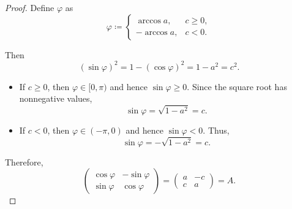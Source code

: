 \begin{proof}
  Define \( \varphi \) as
  \begin{equation*}
    \varphi \coloneqq \begin{cases}
      \arccos a,  &c \geq 0, \\
      -\arccos a, &c < 0.
    \end{cases}
  \end{equation*}

  Then
  \begin{equation*}
    (\sin \varphi)^2 = 1 - (\cos \varphi)^2 = 1 - a^2 = c^2.
  \end{equation*}

  \begin{itemize}
    \item If \( c \geq 0 \), then \( \varphi \in [0, \pi) \) and hence \( \sin \varphi \geq 0 \). Since the square root has nonnegative values,
    \begin{equation*}
      \sin \varphi = \sqrt{ 1 - a^2 } = c.
    \end{equation*}

    \item If \( c < 0 \), then \( \varphi \in (-\pi, 0) \) and hence \( \sin \varphi < 0 \). Thus,
    \begin{equation*}
      \sin \varphi = -\sqrt{ 1 - a^2 } = c.
    \end{equation*}
  \end{itemize}

  Therefore,
  \begin{equation*}
    \begin{pmatrix}
      \cos \varphi & -\sin \varphi \\
      \sin \varphi & \cos \varphi
    \end{pmatrix}
    =
    \begin{pmatrix}
      a & -c \\
      c & a
    \end{pmatrix}
    =
    A.
  \end{equation*}


\end{proof}
